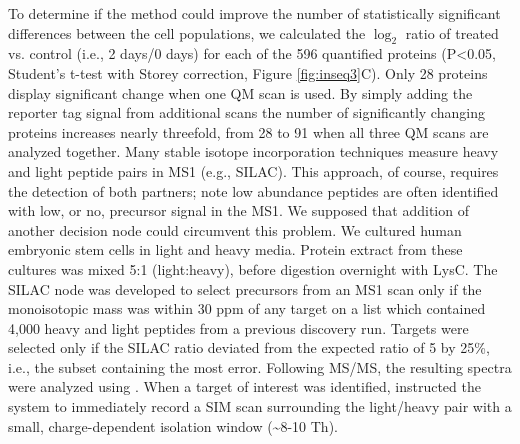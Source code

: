 To determine if the method could improve the number of statistically significant differences between the cell populations, we calculated the $\log_2$ ratio of treated vs. control (i.e., 2 days/0 days) for each of the 596 quantified proteins (P<0.05, Student's t-test with Storey correction, Figure \ref{fig:inseq3}C). Only 28 proteins display significant change when one QM scan is used. By simply adding the reporter tag signal from additional scans the number of significantly changing proteins increases nearly threefold, from 28 to 91 when all three QM scans are analyzed together.
Many stable isotope incorporation techniques measure heavy and light peptide pairs in MS1 (e.g., SILAC). This approach, of course, requires the detection of both partners; note low abundance peptides are often identified with low, or no, precursor signal in the MS1. We supposed that addition of another \inseq{} decision node could circumvent this problem. We cultured human embryonic stem cells in light and heavy media. Protein extract from these cultures was mixed 5:1 (light:heavy), before digestion overnight with LysC. The SILAC node was developed to select precursors from an MS1 scan only if the monoisotopic mass was within 30 ppm of any target on a list which contained 4,000 heavy and light peptides from a previous discovery run. Targets were selected only if the SILAC ratio deviated from the expected ratio of 5 by 25\%, i.e., the subset containing the most error. Following MS/MS, the resulting spectra were analyzed using \inseq{}. When a target of interest was identified, \inseq{} instructed the system to immediately record a SIM scan surrounding the light/heavy pair with a small, charge-dependent isolation window (\textasciitilde8-10 Th).

